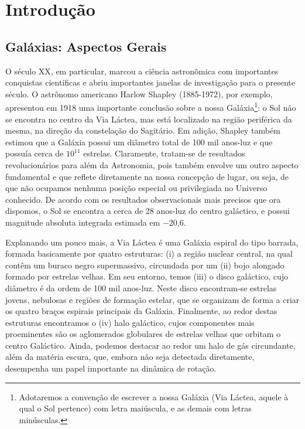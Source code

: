 
\chapter{Introdução}
\label{chp:introducao}
\section{Galáxias: Aspectos Gerais}

O século XX, em particular, marcou a ciência astronômica com importantes conquistas científicas e abriu importantes janelas de investigação para o presente século. O astrônomo americano Harlow Shapley (1885-1972), por exemplo, apresentou em 1918 uma importante conclusão sobre a nossa Galáxia\footnote{Adotaremos a convenção de escrever a nossa Galáxia (Via Láctea, aquele à qual o Sol pertence) com letra maiúscula, e as demais com letras minúsculas.}: o Sol não se encontra no centro da Via Láctea, mas está localizado na região periférica da mesma, na direção da constelação do Sagitário. Em adição, Shapley também estimou que a Galáxia possui um diâmetro total de 100 mil anos-luz e que possuía cerca de $10^{11}$ estrelas. Claramente, tratam-se de resultados revolucionários para além da Astronomia, pois também envolve um outro aspecto fundamental e que reflete diretamente na nossa concepção de lugar, ou seja, de que não ocupamos nenhuma posição especial ou privilegiada no Universo conhecido. De acordo com os resultados observacionais mais precisos que ora dispomos, o Sol se encontra a cerca de 28 anos-luz do centro galáctico, e possui magnitude absoluta integrada estimada em $-$20,6.

Explanando um pouco mais, a Via Láctea é uma Galáxia espiral do tipo barrada, formada basicamente por quatro estruturas: (i) a região nuclear central, na qual contêm um buraco negro supermassivo, circundada por um (ii) bojo alongado formado por estrelas velhas. Em seu entorno, temos (iii) o disco galáctico, cujo diâmetro é da ordem de 100 mil anos-luz. Neste disco encontram-se estrelas jovens, nebulosas e regiões de formação estelar, que se organizam de forma a criar os quatro braços espirais principais da Galáxia. Finalmente, ao redor destas estruturas encontramos o (iv) halo galáctico, cujos componentes mais proeminentes são os aglomerados globulares de estrelas velhas que orbitam o centro Galáctico. Ainda, podemos destacar ao redor um halo de gás circundante, além da matéria escura, que, embora não seja detectada diretamente, desempenha um papel importante na dinâmica de rotação.

